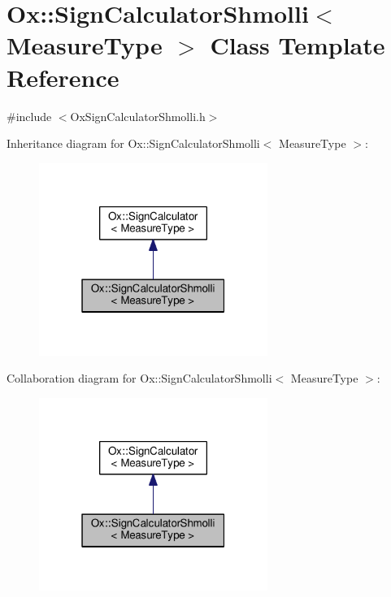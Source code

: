\hypertarget{class_ox_1_1_sign_calculator_shmolli}{}\section{Ox\+:\+:Sign\+Calculator\+Shmolli$<$ Measure\+Type $>$ Class Template Reference}
\label{class_ox_1_1_sign_calculator_shmolli}


{\ttfamily \#include $<$Ox\+Sign\+Calculator\+Shmolli.\+h$>$}



Inheritance diagram for Ox\+:\+:Sign\+Calculator\+Shmolli$<$ Measure\+Type $>$\+:
\nopagebreak
\begin{figure}[H]
\begin{center}
\leavevmode
\includegraphics[width=211pt]{class_ox_1_1_sign_calculator_shmolli__inherit__graph}
\end{center}
\end{figure}


Collaboration diagram for Ox\+:\+:Sign\+Calculator\+Shmolli$<$ Measure\+Type $>$\+:
\nopagebreak
\begin{figure}[H]
\begin{center}
\leavevmode
\includegraphics[width=211pt]{class_ox_1_1_sign_calculator_shmolli__coll__graph}
\end{center}
\end{figure}
